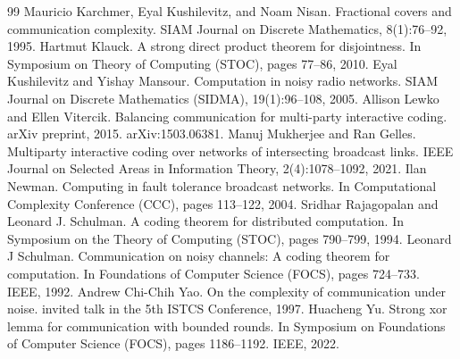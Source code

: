 \begin{thebibliography}{99}
 Mauricio Karchmer, Eyal Kushilevitz, and Noam Nisan. Fractional covers and communication complexity. SIAM Journal on Discrete Mathematics, 8(1):76–92, 1995.
 Hartmut Klauck. A strong direct product theorem for disjointness. In Symposium on Theory of Computing (STOC), pages 77–86, 2010.
 Eyal Kushilevitz and Yishay Mansour. Computation in noisy radio networks. SIAM Journal on Discrete Mathematics (SIDMA), 19(1):96–108, 2005.
 Allison Lewko and Ellen Vitercik. Balancing communication for multi-party interactive coding. arXiv preprint, 2015. arXiv:1503.06381.
 Manuj Mukherjee and Ran Gelles. Multiparty interactive coding over networks of intersecting broadcast links. IEEE Journal on Selected Areas in Information Theory, 2(4):1078–1092, 2021.
 Ilan Newman. Computing in fault tolerance broadcast networks. In Computational Complexity Conference (CCC), pages 113–122, 2004.
 Sridhar Rajagopalan and Leonard J. Schulman. A coding theorem for distributed computation. In Symposium on the Theory of Computing (STOC), pages 790–799, 1994.
 Leonard J Schulman. Communication on noisy channels: A coding theorem for computation. In Foundations of Computer Science (FOCS), pages 724–733. IEEE, 1992.
 Andrew Chi-Chih Yao. On the complexity of communication under noise. invited talk in the 5th ISTCS Conference, 1997.
 Huacheng Yu. Strong xor lemma for communication with bounded rounds. In Symposium on Foundations of Computer Science (FOCS), pages 1186–1192. IEEE, 2022.
\end{thebibliography}
